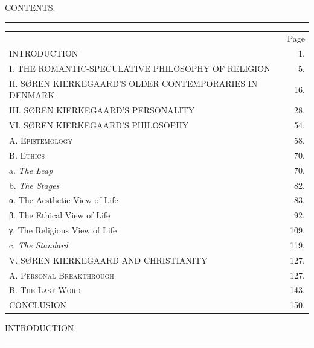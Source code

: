 \documentclass[12pt,a4paper]{book}
\newcommand{\opage}[1]{\marginnote{\footnotesize\textit{[#1]}}}
\begin{document}
\begin{center}CONTENTS.\\[4pt]\rule{1.5cm}{0.4pt}\end{center}
\begin{tabular}{@{}l r@{}}
 & {\small Page}\\
INTRODUCTION & 1.\\
I. THE ROMANTIC-SPECULATIVE PHILOSOPHY OF RELIGION & 5.\\
II. SØREN KIERKEGAARD'S OLDER CONTEMPORARIES IN DENMARK & 16.\\
III. SØREN KIERKEGAARD'S PERSONALITY & 28.\\
VI. SØREN KIERKEGAARD'S PHILOSOPHY & 54.\\
\quad A. \textsc{Epistemology} & 58.\\
\quad B. \textsc{Ethics} & 70.\\
\qquad a. \textit{The Leap} & 70.\\
\qquad b. \textit{The Stages} & 82.\\
\qquad\quad α. The Aesthetic View of Life & 83.\\
\qquad\quad β. The Ethical View of Life & 92.\\
\qquad\quad γ. The Religious View of Life & 109.\\
\qquad c. \textit{The Standard} & 119.\\
V. SØREN KIERKEGAARD AND CHRISTIANITY & 127.\\
\quad A. \textsc{Personal Breakthrough} & 127.\\
\quad B. \textsc{The Last Word} & 143.\\
CONCLUSION & 150.\\
\end{tabular}
\clearpage

\opage{1}\begin{center}INTRODUCTION.\\[4pt]\rule{1.5cm}{0.4pt}\end{center}
\end{document}
